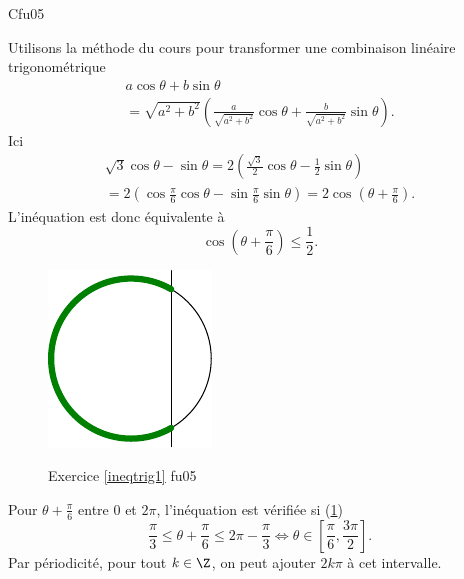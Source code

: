 \begin{tiny}Cfu05\end{tiny} \label{ineqtrig1} Utilisons la méthode du cours pour transformer une combinaison linéaire trigonométrique
\begin{multline*}
  a \cos \theta + b \sin \theta \\
  = \sqrt{a^2 + b^2}\left( \frac{a}{\sqrt{a^2 + b^2}}\cos \theta + \frac{b}{\sqrt{a^2 + b^2}}\sin \theta\right).
\end{multline*}
Ici
\begin{multline*}
  \sqrt{3}\cos \theta - \sin \theta = 2 \left( \frac{\sqrt{3}}{2} \cos \theta - \frac{1}{2}\sin \theta\right)\\
  = 2 \left( \cos \frac{\pi}{6} \cos \theta -\sin \frac{\pi}{6} \sin \theta\right)
  = 2 \cos(\theta + \frac{\pi}{6}).
\end{multline*}
L'inéquation est donc équivalente à 
\[
  \cos(\theta + \frac{\pi}{6}) \leq \frac{1}{2}.
\]
\begin{figure}[h!]
  \centering
  \includegraphics{Cfu05_1.pdf}
  \label{fig:Cfu05_1}
  \caption{Exercice \ref{ineqtrig1} fu05}
\end{figure}
Pour $\theta + \frac{\pi}{6}$ entre $0$ et $2\pi$, l'inéquation est vérifiée si (\ref{fig:Cfu05_1})
\[
  \frac{\pi}{3} \leq \theta + \frac{\pi}{6} \leq 2\pi - \frac{\pi}{3}
  \Leftrightarrow
 \theta \in \left[\frac{\pi}{6} , \frac{3\pi}{2} \right].
\]
Par périodicité, pour tout $k\in \Z$, on peut ajouter $2k\pi$ à cet intervalle. 
